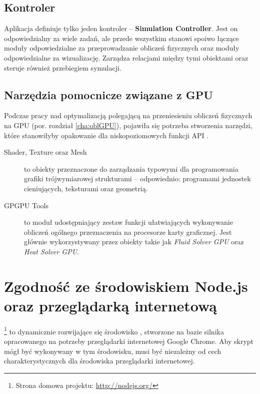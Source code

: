 \subsection{Kontroler}

Aplikacja \en definiuje tylko jeden kontroler -- \textbf{Simulation Controller}.
Jest on odpowiedzialny za wiele zadań, ale przede wszystkim stanowi spoiwo
łączące moduły odpowiedzialne za przeprowadzanie obliczeń fizycznych oraz moduły
odpowiedzialne za wizualizację. Zarządza relacjami między tymi obiektami oraz
steruje również przebiegiem symulacji.

\subsection{Narzędzia pomocnicze związane z GPU}

Podczas pracy nad optymalizacją polegającą na przeniesieniu obliczeń fizycznych
na GPU (por. rozdział \ref{cha:oblGPU}), pojawiła się potrzeba stworzenia
narzędzi, które stanowiłyby opakowanie dla niskopoziomowych funkcji API
. 

\begin{description}

\item[Shader, Texture oraz Mesh] to obiekty przeznaczone do zarządzania
typowymi dla programowania grafiki trójwymiarowej strukturami -- odpowiednio:
programami jednostek cieniujących, teksturami oraz geometrią.

\item[GPGPU Tools] to moduł udostępniający zestaw funkcji ułatwiających
wykonywanie obliczeń ogólnego przeznaczenia na procesorze karty graficznej.
Jest głównie wykorzystywany przez obiekty takie jak \emph{Fluid Solver GPU}
oraz \emph{Heat Solver GPU}.

\end{description}


\section{Zgodność ze środowiskiem Node.js oraz przeglądarką internetową}
\label{sec:zgodNode.js}

\footnote{Strona domowa projektu: \url{http://nodejs.org/}} to
dynamicznie rozwijające się środowisko , stworzone na bazie
silnika  opracowanego na potrzeby przeglądarki internetowej Google
Chrome. Aby skrypt mógł być wykonywany w tym środowisku, musi być niezależny od
cech charakterystycznych dla środowiska przeglądarki internetowej.

